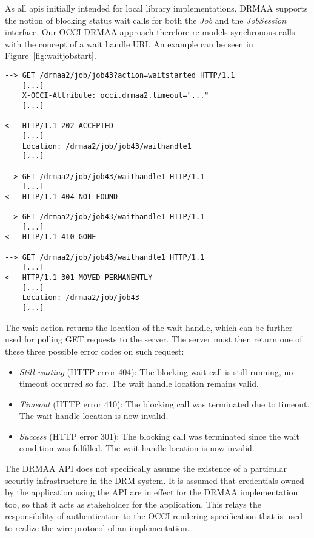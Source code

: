 \documentclass[twocolumn]{svjour3}       %
\begin{document}
As all \gls{api}s initially intended for local library implementations, DRMAA supports the notion of blocking status wait calls for both the \emph{Job} and the \emph{JobSession} interface. Our OCCI-DRMAA approach therefore re-models synchronous calls with the concept of a wait handle URI. An example can be seen in Figure~\ref{fig:waitjobstart}.

\begin{figure*}
\begin{lstlisting}
--> GET /drmaa2/job/job43?action=waitstarted HTTP/1.1
    [...] 
    X-OCCI-Attribute: occi.drmaa2.timeout="..."
    [...] 

<-- HTTP/1.1 202 ACCEPTED
    [...] 
    Location: /drmaa2/job/job43/waithandle1
    [...] 

--> GET /drmaa2/job/job43/waithandle1 HTTP/1.1
    [...] 
<-- HTTP/1.1 404 NOT FOUND

--> GET /drmaa2/job/job43/waithandle1 HTTP/1.1
    [...] 
<-- HTTP/1.1 410 GONE

--> GET /drmaa2/job/job43/waithandle1 HTTP/1.1
    [...] 
<-- HTTP/1.1 301 MOVED PERMANENTLY
    [...] 
    Location: /drmaa2/job/job43
    [...] 
\end{lstlisting}
\caption{Waiting for job start in OCCI-DRMAA}
\label{fig:waitjobstart} 
\end{figure*}

The wait action returns the location of the wait handle, which can be further used for polling GET requests to the server. The server must then return one of these three possible error codes on such request:

\begin{itemize}
\item \emph{Still waiting} (HTTP error 404): The blocking wait call is still running, no timeout occurred so far. The wait handle location remains valid.
\item \emph{Timeout} (HTTP error 410): The blocking call was terminated due to timeout. The wait handle location is now invalid.
\item \emph{Success} (HTTP error 301): The blocking call was terminated since the wait condition was fulfilled. The wait handle location is now invalid.
\end{itemize}

The DRMAA API does not specifically assume the existence of a particular security infrastructure in the DRM system. It is assumed that credentials owned by the application using the API are in effect for the DRMAA implementation too, so that it acts as stakeholder for the application. This relays the responsibility of authentication to the OCCI rendering specification that is used to realize the wire protocol of an implementation. 
\end{document}
